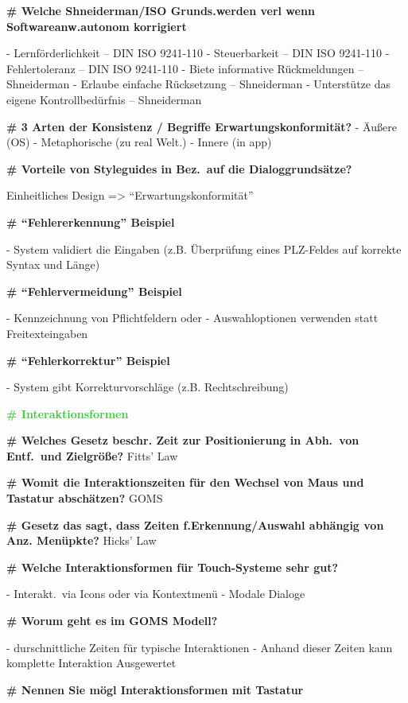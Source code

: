 \documentclass{article}
\begin{document}
\begin{multicols}{3}
\begin{flushleft}
\begin{tiny}
			\textbf{\# Welche Shneiderman/ISO Grunds.werden verl wenn
				Softwareanw.autonom korrigiert}

			- Lernförderlichkeit – DIN ISO 9241-110
			- Steuerbarkeit – DIN ISO 9241-110
			- Fehlertoleranz – DIN ISO 9241-110
			- Biete informative Rückmeldungen – Shneiderman
			- Erlaube einfache Rücksetzung – Shneiderman
			- Unterstütze das eigene Kontrollbedürfnis – Shneiderman

			\textbf{\# 3 Arten der Konsistenz / Begriffe
				Erwartungskonformität?}
			- Äußere (OS)
			- Metaphorische (zu real Welt.)
			- Innere (in app)

			\textbf{\# Vorteile von Styleguides in Bez.\ auf die
				Dialoggrundsätze?}

			Einheitliches Design => ``Erwartungskonformität''

			\textbf{\# ``Fehlererkennung'' Beispiel}

			- System validiert die Eingaben (z.B. Überprüfung eines
			  PLZ-Feldes auf korrekte Syntax und Länge)

			\textbf{\# ``Fehlervermeidung'' Beispiel}

			- Kennzeichnung von Pflichtfeldern oder
			- Auswahloptionen verwenden statt Freitexteingaben

			\textbf{\# ``Fehlerkorrektur'' Beispiel}

			- System gibt Korrekturvorschläge (z.B. Rechtschreibung)

			\textcolor{LimeGreen}{\textbf{\scriptsize{\# Interaktionsformen}}}

			\textbf{\# Welches Gesetz beschr. Zeit zur Positionierung in Abh.\
				von Entf.\ und Zielgröße?}
			Fitts’ Law

			\textbf{\# Womit die Interaktionszeiten für den Wechsel von Maus
				und Tastatur abschätzen?}
			GOMS

			\textbf{\# Gesetz das sagt, dass Zeiten f.Erkennung/Auswahl
				abhängig von Anz. Menüpkte?}
			Hicks’ Law

			\textbf{\# Welche Interaktionsformen für Touch-Systeme sehr gut?}

			- Interakt.\ via Icons oder via Kontextmenü
			- Modale Dialoge

			\textbf{\# Worum geht es im GOMS Modell?}

			- durschnittliche Zeiten für typische Interaktionen
			- Anhand dieser Zeiten kann komplette Interaktion Ausgewertet

			\textbf{\# Nennen Sie mögl Interaktionsformen mit Tastatur}


\end{tiny}
\end{flushleft}
\end{multicols}
\end{document}
